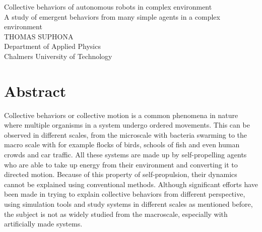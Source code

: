Collective behaviors of autonomous robots in complex environment\\
A study of emergent behaviors from many simple agents in a complex environment\\
THOMAS SUPHONA\\
Department of Applied Physics\\
Chalmers University of Technology \setlength{\parskip}{0.5cm}

\thispagestyle{plain}			%
\setlength{\parskip}{0pt plus 1.0pt}
\section*{Abstract}
Collective behaviors or collective motion is a common phenomena in nature where multiple organisms in a system undergo 
ordered movements. This can be observed in different scales, from the microscale with bacteria swarming to 
the macro scale with for example flocks of birds, schools of fish and even human crowds and car traffic. 
All these systems are made up by self-propelling agents who are able to take up energy from their environment %
and converting it to directed motion.
Because of this property of self-propulsion, their dynamics cannot be explained using conventional methods. 
Although significant efforts have been made in trying to explain collective behaviors from different perspective, using 
simulation tools and study systems in different scales as mentioned before, the subject is not as widely studied from the 
macroscale, especially with artificially made systems.
